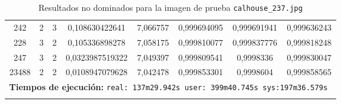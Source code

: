 \begin{longtable}{|c|c|c|c|c|c|c|c|}
242 & 2 & 3 & 0,108630422641 & 7,066757 & 0,999694095 & 0,999691941 & 0,999636243 \\
228 & 3 & 2 & 0,105336898278 & 7,058175 & 0,999810077 & 0,999837776 & 0,999818248 \\
247 & 3 & 2 & 0,0323987519322 & 7,049397 & 0,999809541 & 0,9998336 & 0,999830047 \\
23488 & 2 & 2 & 0,0108947079628 & 7,042478 & 0,999853301 & 0,9998604 & 0,999858565 \\
\multicolumn{8}{|c|}{\textbf{Tiempos de ejecución:} \texttt{real: 137m29.942s user: 399m40.745s sys:197m36.579s
}}\\ \hline
\caption{Resultados no dominados para la imagen de prueba \texttt{calhouse\_237.jpg}}
\label{tab:calhouse_237}
\end{longtable}
\normalsize

